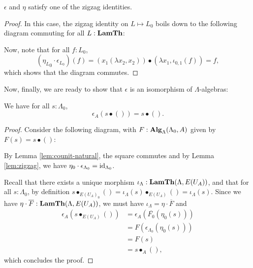 \begin{lemma}\label{lem:zigzag}
  $ \epsilon $ and $ \eta $ satisfy one of the zigzag identities.
\end{lemma}
\begin{proof}
  In this case, the zigzag identity on $ L \mapsto L_0 $ boils down to the following diagram commuting for all $ L : \mathbf{LamTh} $:
  \begin{center}
  \end{center}
  Now, note that for all $ f : L_0 $,
  \[
    ({\eta_L}_0 \cdot \epsilon_{L_0})(f)
    = (x_1 (\lambda x_2, x_2)) \bullet (\lambda x_1, \iota_{0, 1}(f))
    = f,
  \]
  which shows that the diagram commutes.
\end{proof}

Now, finally, we are ready to show that $ \epsilon $ is an isomorphism of $ \Lambda $-algebras:
\begin{lemma}
  We have for all $ s: \Lambda_0 $,
  \[ \epsilon_A(s \bullet ()) = s \bullet (). \]
\end{lemma}
\begin{proof}
  Consider the following diagram, with $ F: \mathbf{Alg}_{\Lambda}(\Lambda_0, A) $ given by $ F(s) = s \bullet () $:
  \begin{center}
  \end{center}
  By Lemma \ref{lem:counit-natural}, the square commutes and by Lemma \ref{lem:zigzag}, we have $ \eta_0 \cdot \epsilon_{\Lambda_0} = \text{id}_{\Lambda_0} $.

  Recall that there exists a unique morphism $ \iota_\Lambda: \mathbf{LamTh}(\Lambda, E(U_A)) $, and that for all $ s: \Lambda_0 $, by definition $ s \bullet_{E(U_A)_0} () = \iota_\Lambda(s) \bullet_{E(U_A)} () = \iota_\Lambda(s) $. Since we have $ \eta \cdot \overline F : \mathbf{LamTh}(\Lambda, E(U_A)) $, we must have $ \iota_\Lambda = \eta \cdot \overline F $ and
  \begin{align*}
    \epsilon_A(s \bullet_{E(U_A)} ())
    &= \epsilon_A(\overline{F_0}(\eta_0(s)))\\
    &= F(\epsilon_{\Lambda_0}(\eta_0(s)))\\
    &= F(s)\\
    &= s \bullet_A (),
  \end{align*}
  which concludes the proof.
\end{proof}

